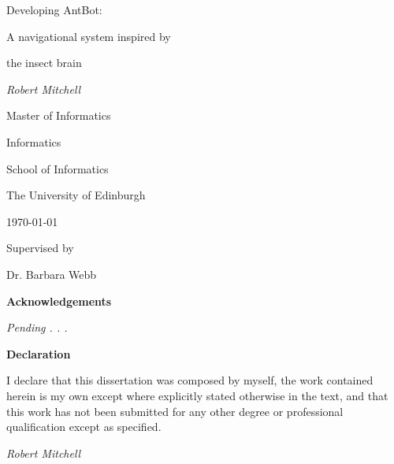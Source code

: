 \documentclass[a4paper,11pt,twoside,openright]{article}
\begin{document}
\centering
\vspace*{6cm}
        {\huge Developing AntBot: \par A navigational system inspired by \par the
          insect brain \par}
\vspace{1cm}
{\Large \textit{Robert Mitchell}}

\vspace{3cm}

{\large Master of Informatics \par}
{\large Informatics \par}
{\large School of Informatics \par}
{\large The University of Edinburgh \par}
\large \today \par

\vfill
Supervised by\par
Dr. Barbara Webb

\newpage
\thispagestyle{empty}
\mbox{}
\newpage

\centering
{\LARGE \textbf{Acknowledgements}}
\begin{flushleft}
 {\small \textit{Pending . . .} }
\end{flushleft}  

\newpage
\thispagestyle{empty}
\mbox{}
\newpage

\centering
{\LARGE\textbf{Declaration}}
\begin{flushleft}
  {\small
    I declare that this dissertation was composed by myself, the work
    contained herein is my own except where explicitly stated otherwise
    in the text, and that this work has not been submitted for any other
    degree or professional qualification except as specified.
    \par 

    \textit{Robert Mitchell}}

\end{flushleft}
\end{document}
